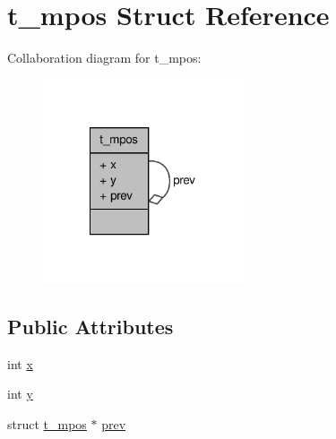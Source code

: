 \hypertarget{structt__mpos}{\section{t\-\_\-mpos \-Struct \-Reference}
\label{structt__mpos}
}


\-Collaboration diagram for t\-\_\-mpos\-:
\nopagebreak
\begin{figure}[H]
\begin{center}
\leavevmode
\includegraphics[width=168pt]{structt__mpos__coll__graph}
\end{center}
\end{figure}
\subsection*{\-Public \-Attributes}
\begin{DoxyCompactItemize}
\item 
int \hyperlink{structt__mpos_a2535bf443d53be4012aea635703805d8}{x}
\item 
int \hyperlink{structt__mpos_ad3333872f81be5e53199b93d9cb1c4a2}{y}
\item 
struct \hyperlink{structt__mpos}{t\-\_\-mpos} $\ast$ \hyperlink{structt__mpos_a567d32671d47d2c2aa189832fe9e16d0}{prev}
\end{DoxyCompactItemize}


